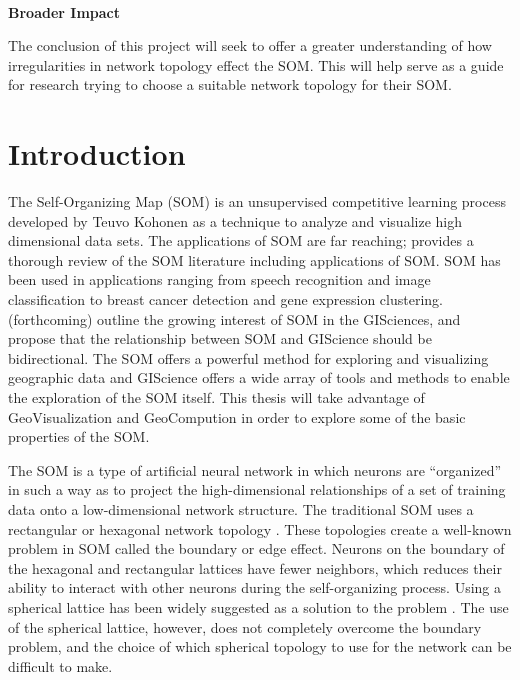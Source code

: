 \documentclass[10pt,titlepage]{article}
\begin{document}
\noindent
\\
{\bf Broader Impact}

The conclusion of this project will seek to offer a greater understanding of
how irregularities in network topology effect the SOM.  This will help serve as
a guide for research trying to choose a suitable network topology for their SOM.

\singlespacing
\newpage



\section{Introduction}
The Self-Organizing Map (SOM) is an unsupervised competitive learning process
developed by Teuvo Kohonen as a technique to analyze and visualize high
dimensional data sets.  The applications of SOM are far reaching;
\cite{Kohonen2000} provides a thorough review of the SOM literature including
applications of SOM.  SOM has been used in applications ranging from speech
recognition and image classification to breast cancer detection and gene
expression clustering.  \citeauthor{skupin07} (forthcoming) outline the growing interest of SOM in
the GISciences, and propose that the relationship between SOM and GIScience
should be bidirectional.  The SOM offers a powerful method for exploring and
visualizing geographic data and GIScience offers a wide array of tools
and methods to enable the exploration of the SOM itself.  This thesis will take
advantage of GeoVisualization and GeoCompution in order to explore some of the basic
properties of the SOM.

The SOM is a type of artificial neural network in which neurons are ``organized''
in such a way as to project the high-dimensional relationships of a set of
training data onto a low-dimensional network structure.  The traditional
SOM uses a rectangular or hexagonal network topology \citep{Kohonen2000}.  These topologies 
create a well-known problem in SOM called the boundary or edge effect.  Neurons on
the boundary of the hexagonal and rectangular lattices have fewer neighbors,
which reduces their ability to interact with other neurons during the
self-organizing process.  Using a spherical lattice has been widely suggested as a
solution to the problem \citep{ritter99, boudjemai2003, sangole03,
Nishio:2006fk, wu2006}. The use of the spherical lattice, however, does not
completely overcome the boundary problem, and the choice of which spherical
topology to use for the network can be difficult to make.
\end{document}

